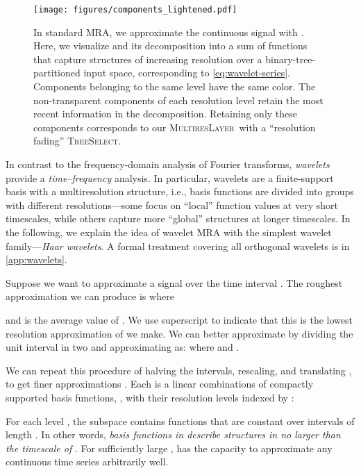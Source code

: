 \documentclass{article}
\theoremstyle{plain}
\theoremstyle{definition}
\theoremstyle{remark}
\newcommand{\ourlayer}{\textsc{MultiresLayer}}
\begin{document}
\begin{figure}[t]
\texttt{[image: figures/components\_lightened.pdf]}
\centering
\vspace{-2mm}
\caption{In standard MRA, we approximate the continuous signal  with . Here, we visualize  and its decomposition into a sum of functions that capture structures of increasing resolution over a binary-tree-partitioned input space, corresponding to \cref{eq:wavelet-series}. Components belonging to the same level have the same color. The non-transparent components of each resolution level retain the most recent information in the decomposition. Retaining only these components corresponds to our \ourlayer\ with a ``resolution fading'' \textsc{TreeSelect}.
} \vspace{-4mm}
\label{fig:components}
\end{figure}






In contrast to the frequency-domain analysis of Fourier transforms, \emph{wavelets} provide a \emph{time--frequency} analysis. In particular, wavelets are a finite-support basis with a multiresolution structure, i.e., basis functions are divided into groups with different resolutions---some focus on ``local'' function values at very short timescales, while others capture more ``global'' structures at longer timescales. 
In the following, we explain the idea of wavelet MRA with the simplest wavelet family---\emph{Haar wavelets}. 
A formal treatment covering all orthogonal wavelets is in \cref{app:wavelets}. 

Suppose we want to approximate a signal  over the time interval . 
The roughest approximation we can produce is  where 

and  is the average value of . 
We use superscript  to indicate that this is the lowest resolution approximation of  we make.
We can better approximate  by dividing the unit interval in two and approximating  as:  where  and .

We can repeat this procedure of halving the intervals, rescaling, and translating , to get finer approximations .
Each  is a linear combinations of compactly supported basis functions,
,
with their resolution levels indexed by :

For each level ,  the subspace 
contains functions that are constant over intervals of length .
In other words, \emph{basis functions in  describe structures in  no larger than the timescale of }. For sufficiently large ,  has the capacity to approximate any continuous time series arbitrarily well. 
\end{document}
